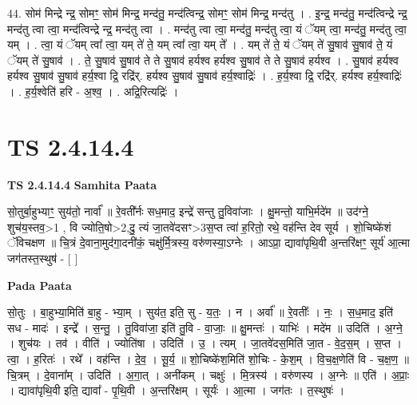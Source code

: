 \documentclass[17pt]{extarticle}
\begin{document}
44. सोम॑ मिन्द्रे न्द्र॒ सोमꣳ॒॒ सोम॑ मिन्द्र॒ मन्द॑तु॒ मन्द॑त्विन्द्र॒ सोमꣳ॒॒ सोम॑ मिन्द्र॒ मन्द॑तु । . इ॒न्द्र॒ मन्द॑तु॒ मन्द॑त्विन्द्रे न्द्र॒ मन्द॑तु त्वा त्वा॒ मन्द॑त्विन्द्रे न्द्र॒ मन्द॑तु त्वा । . मन्द॑तु त्वा त्वा॒ मन्द॑तु॒ मन्द॑तु त्वा॒ यं ॅयम् त्वा॒ मन्द॑तु॒ मन्द॑तु त्वा॒ यम् । . त्वा॒ यं ॅयम् त्वा᳚ त्वा॒ यम् ते॑ ते॒ यम् त्वा᳚ त्वा॒ यम् ते᳚ । . यम् ते॑ ते॒ यं ॅयम् ते॑ सु॒षाव॑ सु॒षाव॑ ते॒ यं ॅयम् ते॑ सु॒षाव॑ । . ते॒ सु॒षाव॑ सु॒षाव॑ ते ते सु॒षाव॑ हर्यश्व हर्यश्व सु॒षाव॑ ते ते सु॒षाव॑ हर्यश्व । . सु॒षाव॑ हर्यश्व हर्यश्व सु॒षाव॑ सु॒षाव॑ हर्य॒श्वा द्रि॒ रद्रि॑र्. हर्यश्व सु॒षाव॑ सु॒षाव॑ हर्य॒श्वाद्रिः॑ । . ह॒र्य॒श्वा द्रि॒ रद्रि॑र्. हर्यश्व हर्य॒श्वाद्रिः॑ । . ह॒र्य॒श्वेति॑ हरि - अ॒श्व॒ । . अद्रि॒रित्यद्रिः॑ । \newline
\pagebreak
{}

\section{ TS 2.4.14.4 }

\textbf{TS 2.4.14.4 } \newline
\textbf{Samhita Paata} \newline

सो॒तुर्बा॒हुभ्याꣳ॒॒ सुय॑तो॒ नार्वा᳚ ॥ रे॒वती᳚र्नः सध॒माद॒ इन्द्रे॑ सन्तु तु॒विवा॑जाः । क्षु॒मन्तो॒ याभि॒र्मदे॑म ॥ उद॑ग्ने॒ शुच॑य॒स्तव॒>1 , वि ज्योति॒षो>2,दु॒ त्यं जा॒तवे॑दसꣳ>3स॒प्त त्वा॑ ह॒रितो॒ रथे॒ वह॑न्ति देव सूर्य । शो॒चिष्के॑शं ॅविचक्षण ॥ चि॒त्रं दे॒वाना॒मुद॑गा॒दनी॑कं॒ चक्षु॑र्मि॒त्रस्य॒ वरु॑णस्या॒ऽग्नेः । आऽप्रा॒ द्यावा॑पृथि॒वी अ॒न्तरि॑क्षꣳ॒॒ सूर्य॑ आ॒त्मा जग॑तस्त॒स्थुष॑ - [  ] \newline

\textbf{Pada Paata} \newline

सो॒तुः । बा॒हुभ्या॒मिति॑ बा॒हु - भ्या॒म् । सुय॑त॒ इति॒ सु - य॒तः॒ । न । अर्वा᳚ ॥ रे॒वतीः᳚ । नः॒ । स॒ध॒माद॒ इति॑ सध - मादः॑ । इन्द्रे᳚ । स॒न्तु॒ । तु॒विवा॑जा॒ इति॑ तु॒वि - वा॒जाः॒ ॥ क्षु॒मन्तः॑ । याभिः॑ । मदे॑म ॥ उदिति॑ । अ॒ग्ने॒ । शुच॑यः । तव॑ । वीति॑ । ज्योति॑षा । उदिति॑ । उ॒ । त्यम् । जा॒तवे॑दस॒मिति॑ जा॒त - वे॒द॒स॒म् । स॒प्त । त्वा॒ । ह॒रितः॑ । रथे᳚ । वह॑न्ति । दे॒व॒ । सू॒र्य॒ ॥ शो॒चिष्के॑श॒मिति॑ शो॒चिः - के॒श॒म् । वि॒च॒क्ष॒णेति॑ वि -  च॒क्ष॒ण॒ ॥ चि॒त्रम् । दे॒वाना᳚म् । उदिति॑ । अ॒गा॒त् । अनी॑कम् । चक्षुः॑ । मि॒त्रस्य॑ । वरु॑णस्य ।   अ॒ग्नेः ॥ एति॑ । अ॒प्राः॒ । द्यावा॑पृथि॒वी इति॒ द्यावा᳚ - पृ॒थि॒वी । अ॒न्तरि॑क्षम् । सूर्यः॑ । आ॒त्मा ।   जग॑तः । त॒स्थुषः॑ ।  \newline
\end{document}

